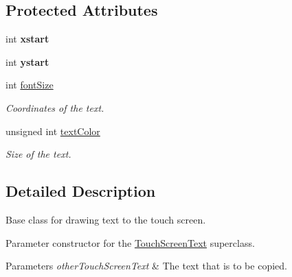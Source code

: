 \subsection*{Protected Attributes}
\begin{DoxyCompactItemize}
\item 
\hypertarget{class_touch_screen_text_af22a7ca72947722e7ff76ec0750dc851}{int {\bfseries xstart}}\label{class_touch_screen_text_af22a7ca72947722e7ff76ec0750dc851}

\item 
\hypertarget{class_touch_screen_text_a779b5c6ee8be737c4fbfc7ad002c5854}{int {\bfseries ystart}}\label{class_touch_screen_text_a779b5c6ee8be737c4fbfc7ad002c5854}

\item 
\hypertarget{class_touch_screen_text_a098422c325ce23c6d28d2b72ffb52a1a}{int \hyperlink{class_touch_screen_text_a098422c325ce23c6d28d2b72ffb52a1a}{font\+Size}}\label{class_touch_screen_text_a098422c325ce23c6d28d2b72ffb52a1a}

\begin{DoxyCompactList}\small\item\em Coordinates of the text. \end{DoxyCompactList}\item 
\hypertarget{class_touch_screen_text_a0b555c473dff7436a79c836926235217}{unsigned int \hyperlink{class_touch_screen_text_a0b555c473dff7436a79c836926235217}{text\+Color}}\label{class_touch_screen_text_a0b555c473dff7436a79c836926235217}

\begin{DoxyCompactList}\small\item\em Size of the text. \end{DoxyCompactList}\end{DoxyCompactItemize}


\subsection{Detailed Description}
Base class for drawing text to the touch screen. 

Parameter constructor for the \hyperlink{class_touch_screen_text}{Touch\+Screen\+Text} superclass.


\begin{DoxyParams}{Parameters}
{\em other\+Touch\+Screen\+Text} & The text that is to be copied. \\
\hline
\end{DoxyParams}


